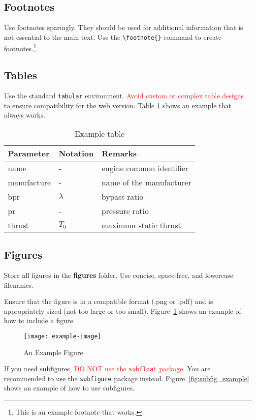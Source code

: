 \documentclass[
  manuscript=article,  %
  layout=preprint,  %
  year=20xx,
  volume=x,
]{extra/joas}
\begin{document}
\subsection{Footnotes}
Use footnotes sparingly. They should be used for additional information that is not essential to the main text. Use the \verb|\footnote{}| command to create footnotes.\footnote{This is an example footnote that works.}

\subsection{Tables}
Use the standard \texttt{tabular} environment. \textcolor{red}{Avoid custom or complex table designs} to ensure compatibility for the web version. Table \ref{tb:example_table} shows an example that always works.

\begin{table}[htbp!]
  \centering
  \small
  \caption{Example table}
  \label{tb:example_table}
  \begin{tabular}{lll}
  \toprule
  \textbf{Parameter} & \textbf{Notation} & \textbf{Remarks} \\
  \midrule
  name & - & engine common identifier \\
  manufacture & - & name of the manufacturer  \\
  bpr & $\lambda$ & bypass ratio \\
  pr & - & pressure ratio \\
  thrust & $T_0$ & maximum static thrust\\
  \bottomrule
  \end{tabular}
\end{table}

\subsection{Figures}
Store all figures in the \textbf{figures} folder. Use concise, space-free, and lowercase filenames.

Ensure that the figure is in a compatible format (.png or .pdf) and is appropriately sized (not too large or too small). Figure~\ref{fig:example} shows an example of how to include a figure. 

\begin{figure}[htbp!]
  \centering
  \texttt{[image: example-image]}
  \caption{An Example Figure}
  \label{fig:example}
\end{figure}

If you need subfigures, \textcolor{red}{DO NOT use the \texttt{subfloat} package}. You are recommended to use the \texttt{subfigure} package instead. Figure~\ref{fig:subfig_example} shows an example of how to use subfigures.
\end{document}
